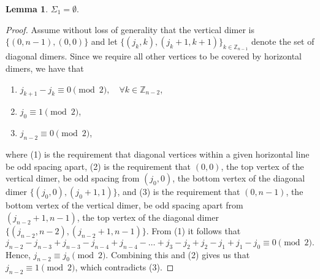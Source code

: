 \documentclass[12pt,reqno]{amsart}
\numberwithin{equation}{section}
\newtheorem{lem}[theo]{{\sc \bf Lemma}}
\begin{document}
\begin{lem}\label{s1empty} 
$\Sigma_1=\emptyset.$
\end{lem}
\begin{proof}
Assume without loss of generality that the vertical dimer is $\{(0,n-1),(0,0)\}$ and let $\{(j_k,k),(j_k+1,k+1)\}_{k\in\mathbb Z_{n-1}}$ denote the set of diagonal dimers. Since we require all other vertices to be covered by horizontal dimers, we have that 
\begin{enumerate}\label{ee}
\item{ $j_{k+1}-j_{k}\equiv 0\pmod 2,\quad\forall k\in\mathbb Z_{n-2}$},
\item{ $j_0\equiv 1\pmod 2$},
\item{ $j_{n-2}\equiv 0\pmod 2$},
\end{enumerate}
where (1) is the requirement that diagonal vertices within a given horizontal line be odd spacing apart, (2) is the requirement that $(0,0)$, the top vertex of the vertical dimer, be odd spacing from $(j_0,0)$, the bottom vertex of the diagonal dimer $\{(j_0,0),(j_0+1,1)\}$, and (3) is the requirement that $(0,n-1)$, the bottom vertex of the vertical dimer, be odd spacing apart from $(j_{n-2}+1,n-1)$, the top vertex of the diagonal dimer $\{(j_{n-2},n-2),(j_{n-2}+1,n-1)\}$. From (1) it follows that \[j_{n-2}-j_{n-3}+j_{n-3}-j_{n-4}+j_{n-4}-\ldots+j_3-j_2+j_2-j_1+j_1-j_0\equiv 0\pmod 2.\] Hence, $j_{n-2}\equiv j_0 \pmod 2$. Combining this and (2) gives us that $j_{n-2}\equiv 1\pmod 2$, which contradicts (3).  
\end{proof}
\end{document}
